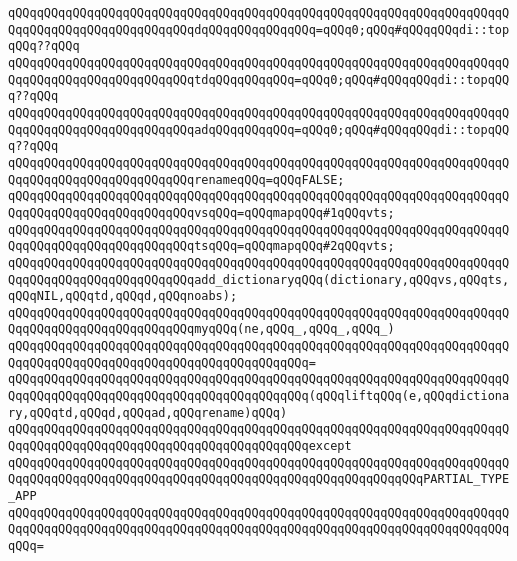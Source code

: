 \verb|qQQqqQQqqQQqqQQqqQQqqQQqqQQqqQQqqQQqqQQqqQQqqQQqqQQqqQQqqQQqqQQqqQQqqQQqqQQqqQQqqQQqqQQqqQQqqQQqdqQQqqQQqqQQqqQQq=qQQq0;qQQq#qQQqqQQqdi::topqQQq??qQQq|\newline
\verb|qQQqqQQqqQQqqQQqqQQqqQQqqQQqqQQqqQQqqQQqqQQqqQQqqQQqqQQqqQQqqQQqqQQqqQQqqQQqqQQqqQQqqQQqqQQqqQQqtdqQQqqQQqqQQq=qQQq0;qQQq#qQQqqQQqdi::topqQQq??qQQq|\newline
\verb|qQQqqQQqqQQqqQQqqQQqqQQqqQQqqQQqqQQqqQQqqQQqqQQqqQQqqQQqqQQqqQQqqQQqqQQqqQQqqQQqqQQqqQQqqQQqqQQqadqQQqqQQqqQQq=qQQq0;qQQq#qQQqqQQqdi::topqQQq??qQQq|\newline
\newline
\verb|qQQqqQQqqQQqqQQqqQQqqQQqqQQqqQQqqQQqqQQqqQQqqQQqqQQqqQQqqQQqqQQqqQQqqQQqqQQqqQQqqQQqqQQqqQQqqQQqrenameqQQq=qQQqFALSE;|\newline
\newline
\verb|qQQqqQQqqQQqqQQqqQQqqQQqqQQqqQQqqQQqqQQqqQQqqQQqqQQqqQQqqQQqqQQqqQQqqQQqqQQqqQQqqQQqqQQqqQQqqQQqvsqQQq=qQQqmapqQQq#1qQQqvts;|\newline
\verb|qQQqqQQqqQQqqQQqqQQqqQQqqQQqqQQqqQQqqQQqqQQqqQQqqQQqqQQqqQQqqQQqqQQqqQQqqQQqqQQqqQQqqQQqqQQqqQQqtsqQQq=qQQqmapqQQq#2qQQqvts;|\newline
\newline
\verb|qQQqqQQqqQQqqQQqqQQqqQQqqQQqqQQqqQQqqQQqqQQqqQQqqQQqqQQqqQQqqQQqqQQqqQQqqQQqqQQqqQQqqQQqqQQqqQQqadd_dictionaryqQQq(dictionary,qQQqvs,qQQqts,qQQqNIL,qQQqtd,qQQqd,qQQqnoabs);|\newline
\newline
\verb|qQQqqQQqqQQqqQQqqQQqqQQqqQQqqQQqqQQqqQQqqQQqqQQqqQQqqQQqqQQqqQQqqQQqqQQqqQQqqQQqqQQqqQQqqQQqqQQqmyqQQq(ne,qQQq_,qQQq_,qQQq_)|\newline
\verb|qQQqqQQqqQQqqQQqqQQqqQQqqQQqqQQqqQQqqQQqqQQqqQQqqQQqqQQqqQQqqQQqqQQqqQQqqQQqqQQqqQQqqQQqqQQqqQQqqQQqqQQqqQQqqQQq=|\newline
\verb|qQQqqQQqqQQqqQQqqQQqqQQqqQQqqQQqqQQqqQQqqQQqqQQqqQQqqQQqqQQqqQQqqQQqqQQqqQQqqQQqqQQqqQQqqQQqqQQqqQQqqQQqqQQqqQQq(qQQqliftqQQq(e,qQQqdictionary,qQQqtd,qQQqd,qQQqad,qQQqrename)qQQq)|\newline
\verb|qQQqqQQqqQQqqQQqqQQqqQQqqQQqqQQqqQQqqQQqqQQqqQQqqQQqqQQqqQQqqQQqqQQqqQQqqQQqqQQqqQQqqQQqqQQqqQQqqQQqqQQqqQQqqQQqexcept|\newline
\verb|qQQqqQQqqQQqqQQqqQQqqQQqqQQqqQQqqQQqqQQqqQQqqQQqqQQqqQQqqQQqqQQqqQQqqQQqqQQqqQQqqQQqqQQqqQQqqQQqqQQqqQQqqQQqqQQqqQQqqQQqqQQqqQQqPARTIAL_TYPE_APP|\newline
\verb|qQQqqQQqqQQqqQQqqQQqqQQqqQQqqQQqqQQqqQQqqQQqqQQqqQQqqQQqqQQqqQQqqQQqqQQqqQQqqQQqqQQqqQQqqQQqqQQqqQQqqQQqqQQqqQQqqQQqqQQqqQQqqQQqqQQqqQQqqQQqqQQq=|\newline
